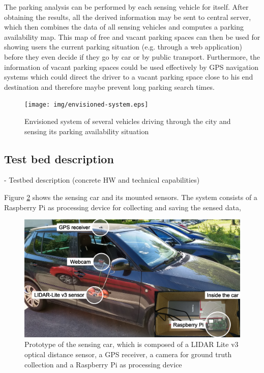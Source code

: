 The parking analysis can be performed by each sensing vehicle for itself. After obtaining the results, all the derived information may be sent to central server, which then combines the data of all sensing vehicles and computes a parking availability map. This map of free and vacant parking spaces can then be used for showing users the current parking situation (e.g. through a web application) before they even decide if they go by car or by public transport. Furthermore, the information of vacant parking spaces could be used effectively by GPS navigation systems which could direct the driver to a vacant parking space close to his end destination and therefore maybe prevent long parking search times.

\begin{figure}
	\centering
	\texttt{[image: img/envisioned-system.eps]}
	\caption{Envisioned system of several vehicles driving through the city and sensing its parking availability situation}
	\label{fig:envisioned_system}
\end{figure}







\subsection{Test bed description}
\label{sec:test_bed}

- Testbed description (concrete HW and technical capabilities)

Figure \ref{fig:sensing_car} shows the sensing car and its mounted sensors. The system consists of a Raspberry Pi as processing device for collecting and saving the sensed data, 

\begin{figure}
	\centering
	\includegraphics[width=\textwidth]{img/car.jpg}
	\caption{Prototype of the sensing car, which is composed of a LIDAR Lite v3 optical distance sensor, a GPS receiver, a camera for ground truth collection and a Raspberry Pi as processing device}
	\label{fig:sensing_car}
\end{figure}



